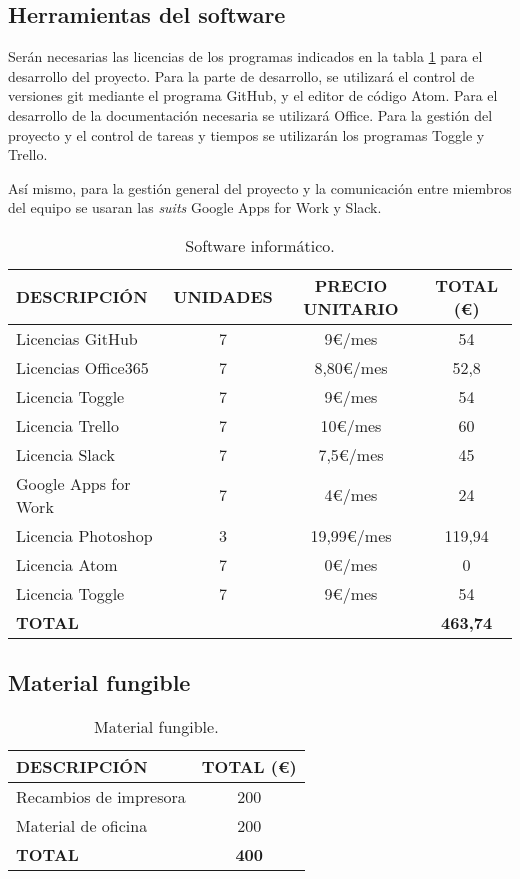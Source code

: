 \documentclass[10pt,a4paper,oldfontcommands]{plantillaDPDS}
\begin{document}
\subsection{Herramientas del software}
\par Serán necesarias las licencias de los programas indicados en la tabla \ref{tab:software} para el desarrollo del proyecto. Para la parte de desarrollo, se utilizará el control de versiones git mediante el programa GitHub, y el editor de código Atom. Para el desarrollo de la documentación necesaria se utilizará Office. Para la gestión del proyecto y el control de tareas y tiempos se utilizarán los programas Toggle y Trello.
\par Así mismo, para la gestión general del proyecto y la comunicación entre miembros del equipo se usaran las \textit{suits} Google Apps for Work y Slack. 


\begin{table}[H]
\begin{center}
\begin{tabular}{l c c c}
\textbf{DESCRIPCIÓN} & \textbf{UNIDADES} & \textbf{PRECIO UNITARIO} & \textbf{TOTAL (\euro)}\\ \hline \hline
Licencias GitHub & 7 & 9\euro/mes & 54\\
Licencias Office365 & 7 & 8,80\euro/mes & 52,8\\
Licencia Toggle & 7 & 9\euro/mes & 54\\
Licencia Trello & 7 & 10\euro/mes & 60\\
Licencia Slack & 7 & 7,5\euro/mes & 45\\
Google Apps for Work & 7 & 4\euro/mes & 24\\
Licencia Photoshop & 3 & 19,99\euro/mes & 119,94\\
Licencia Atom & 7 & 0\euro/mes & 0\\
Licencia Toggle & 7 & 9\euro/mes & 54\\ \hline \hline
\textbf{TOTAL} & & & \textbf{463,74}\\ \hline
\end{tabular}
\caption{Software informático.}
\label{tab:software}
\end{center}
\end{table}



\subsection{Material fungible}
\begin{table}[H]
\begin{center}
\begin{tabular}{l c}
\textbf{DESCRIPCIÓN} & \textbf{TOTAL (\euro)}\\ \hline \hline
Recambios de impresora & 200\\
Material de oficina & 200\\ \hline \hline
\textbf{TOTAL} & \textbf{400}\\ \hline
\end{tabular}
\caption{Material fungible.}
\label{tab:fungible}
\end{center}
\end{table}
\end{document}
